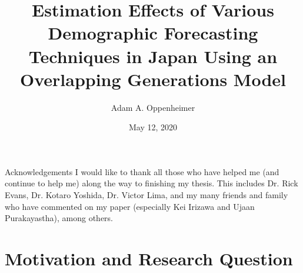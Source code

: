 \documentclass[12pt]{beamer}
\title[Demographic Forecasting]{\normalsize \centering Estimation Effects of Various Demographic Forecasting Techniques in Japan Using an Overlapping Generations Model}
\author{Adam A. Oppenheimer}
\institute[]{Advisor: Dr. Rick Evans\\University of Chicago}
\date{May 12, 2020}
\begin{document}

\maketitle

\begin{frame}{Acknowledgements}
	I would like to thank all those who have helped me (and continue to help me) along the way to finishing my thesis. This includes Dr. Rick Evans, Dr. Kotaro Yoshida, Dr. Victor Lima, and my many friends and family who have commented on my paper (especially Kei Irizawa and Ujaan Purakayastha), among others.
\end{frame}

\section{Motivation and Research Question}
\end{document}

